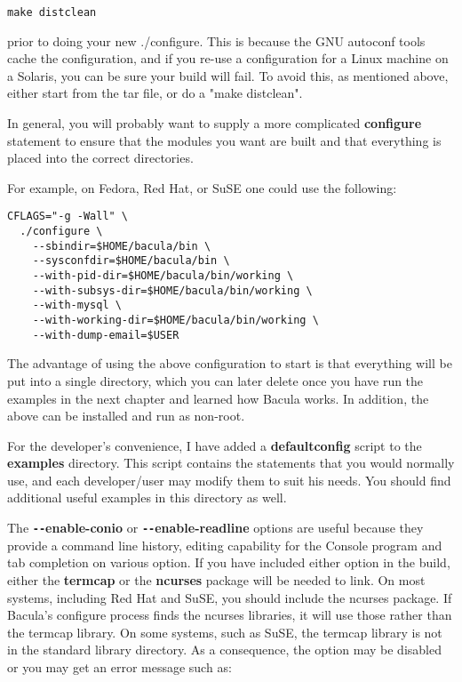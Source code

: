 \footnotesize
\begin{verbatim}
make distclean
\end{verbatim}
\normalsize

prior to doing your new ./configure. This is because the GNU autoconf tools
cache the configuration, and if you re-use a configuration for a Linux machine
on a Solaris, you can be sure your build will fail. To avoid this, as
mentioned above, either start from the tar file, or do a "make distclean". 

In general, you will probably want to supply a more complicated {\bf
configure} statement to ensure that the modules you want are built and that
everything is placed into the correct directories. 

For example, on Fedora, Red Hat, or SuSE one could use the following: 

\footnotesize
\begin{verbatim}
CFLAGS="-g -Wall" \
  ./configure \
    --sbindir=$HOME/bacula/bin \
    --sysconfdir=$HOME/bacula/bin \
    --with-pid-dir=$HOME/bacula/bin/working \
    --with-subsys-dir=$HOME/bacula/bin/working \
    --with-mysql \
    --with-working-dir=$HOME/bacula/bin/working \
    --with-dump-email=$USER
\end{verbatim}
\normalsize

The advantage of using the above configuration to start is that
everything will be put into a single directory, which you can later delete
once you have run the examples in the next chapter and learned how Bacula
works. In addition, the above can be installed and run as non-root. 

For the developer's convenience, I have added a {\bf defaultconfig} script to
the {\bf examples} directory. This script contains the statements that you
would normally use, and each developer/user may modify them to suit his needs.
You should find additional useful examples in this directory as well. 

The {\bf \verb:--:enable-conio} or {\bf \verb:--:enable-readline} options are
useful because they provide a command line history, editing capability for the
Console program and tab completion on various option. If you have included
either option in the build, either the {\bf termcap} or the {\bf ncurses}
package will be needed to link. On most systems, including Red Hat and SuSE,
you should include the ncurses package.  If Bacula's configure process finds
the ncurses libraries, it will use those rather than the termcap library.  On
some systems, such as SuSE, the termcap library is not in the standard library
directory.  As a consequence, the option may be disabled or you may get an
error message such as:

